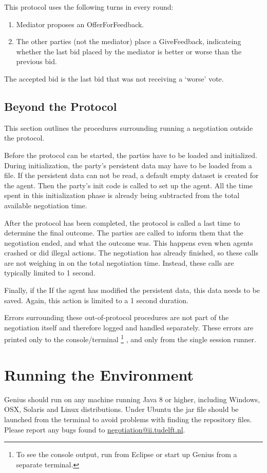 \documentclass[]{article}
\begin{document}
This protocol uses the following turns in every round:
\begin{enumerate}
\item Mediator proposes an OfferForFeedback. 
\item The other parties (not the mediator) place a GiveFeedback,  indicateing whether the last bid placed by the mediator is better or worse than the previous bid.
\end{enumerate}

The accepted bid is the last bid that was not receiving a `worse' vote. 

\subsection{Beyond the Protocol}
This section outlines the procedures surrounding running a negotiation outside the protocol.

Before the protocol can be started, the parties have to be loaded and initialized. During initialization, the party's persistent data may have to be loaded from a file. If the persistent data can not be read, a default empty dataset is created for the agent. Then the party's init code is called to set up the agent. All the time spent in this initialization phase is already being subtracted from the total available negotiation time.

After the protocol has been completed, the protocol is called a last time to determine the final outcome. 
The parties are called to inform them that the negotiation ended, and what the outcome was. This happens even when agents crashed or did illegal actions. The negotiation has already finished, so these calls are not weighing in on the total negotiation time. Instead, these calls are typically limited to 1 second. 

Finally, if the If the agent has modified the persistent data, this data needs to be saved. Again, this action is limited to a 1 second duration.

Errors surrounding these out-of-protocol procedures are not part of the negotiation itself and therefore logged and handled separately. These errors are printed only to the console/terminal \footnote{To see the console output, run from Eclipse or start up Genius from a separate terminal. }
, and only from the single session runner.


\section{Running the Environment}
Genius should run on any machine running Java 8 or higher, including Windows, OSX, Solaris and Linux distributions. Under Ubuntu the jar file should be launched from the terminal to avoid problems with finding the repository files. Please report any bugs found to \url{negotiation@ii.tudelft.nl}.
\end{document}
